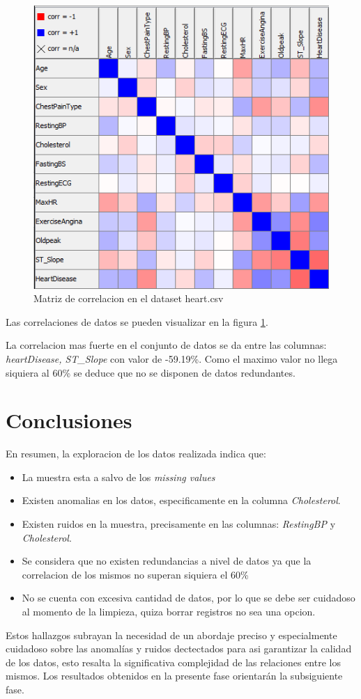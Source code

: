 \documentclass[12pt, letterpaper]{article}
\begin{document}
\begin{figure}
    \centering
    \includegraphics[scale=1]{correlacion.png}
    \caption{Matriz de correlacion en el dataset heart.csv}
    \label{fig:correlacion}
\end{figure}

Las correlaciones de datos se pueden visualizar en la figura \ref{fig:correlacion}.


La correlacion mas fuerte en el conjunto de datos se da entre las 
columnas: \textit{heartDisease, ST\_Slope} con valor de -59.19\%.
Como el maximo valor no llega siquiera al 60\% se deduce que no se disponen de datos redundantes.

\newpage
\section{Conclusiones}
En resumen, la exploracion de los datos realizada indica que:
\begin{itemize}
    \item{La muestra esta a salvo de los \textit{missing values}}
    \item{Existen anomalias en los datos, especificamente en la columna \textit{Cholesterol}.}
    \item{Existen ruidos en la muestra, precisamente en las columnas: \textit{RestingBP}
    y \textit{Cholesterol}.}
    \item{Se considera que no existen redundancias a nivel de datos ya que la correlacion
    de los mismos no superan siquiera el 60\%}
    \item{No se cuenta con excesiva cantidad de datos, por lo que se debe ser cuidadoso
    al momento de la limpieza, quiza borrar registros no sea una opcion.}
\end{itemize}
Estos hallazgos subrayan la necesidad de un abordaje preciso y especialmente cuidadoso 
sobre las anomalías y ruidos dectectados para asi garantizar la calidad de los datos, 
esto resalta la significativa complejidad de las relaciones entre los mismos. 
Los resultados obtenidos en la presente fase orientarán la subsiguiente fase.

\newpage
\printbibliography
\end{document}
